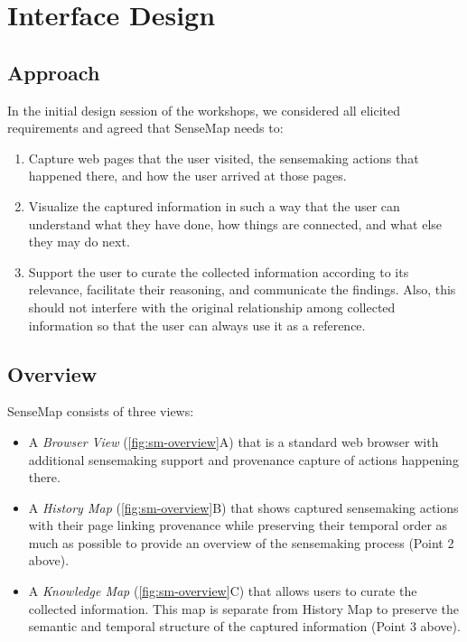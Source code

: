 \section{Interface Design}
\label{sec:sm-design}

\subsection{Approach}
In the initial design session of the workshops, we considered all elicited requirements and agreed that SenseMap needs to:
\begin{enumerate}
	\item Capture web pages that the user visited, the sensemaking actions that happened there, and how the user arrived at those pages.
	\item Visualize the captured information in such a way that the user can understand what they have done, how things are connected, and what else they may do next.
	\item Support the user to curate the collected information according to its relevance, facilitate their reasoning, and communicate the findings. Also, this should not interfere with the original relationship among collected information so that the user can always use it as a reference.
\end{enumerate}

\subsection{Overview}
SenseMap consists of three views:

\begin{itemize}
	\item A \textit{Browser View} (\autoref{fig:sm-overview}A) that is a standard web browser with additional sensemaking support and provenance capture of actions happening there.
	\item A \emph{History Map} (\autoref{fig:sm-overview}B) that shows captured sensemaking actions with their page linking provenance while preserving their temporal order as much as possible to provide an overview of the sensemaking process (Point 2 above).
	\item A \emph{Knowledge Map} (\autoref{fig:sm-overview}C) that allows users to curate the collected information. This map is separate from History Map to preserve the semantic and temporal structure of the captured information (Point 3 above).
\end{itemize}

